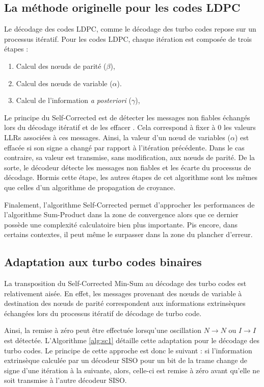 \subsection{La méthode originelle pour les codes LDPC}
Le décodage des codes LDPC, comme le décodage des turbo codes repose sur un processus itératif. Pour les codes LDPC,
chaque itération est composée de trois étapes : 
\begin{enumerate}
	\item Calcul des nœuds de parité ($\beta$),
	\item Calcul des nœuds de variable ($\alpha$).
	\item Calcul de l'information \textit{a posteriori} ($\gamma$),
\end{enumerate}
Le principe du Self-Corrected est de détecter les messages non fiables échangés lors du décodage itératif et de les \og 
effacer \fg. Cela correspond à fixer à 0 les valeurs LLRs associées à ces messages. Ainsi, la valeur d'un nœud de 
variables ($\alpha$) est effacée si son signe a changé par rapport à l’itération précédente. Dans le cas contraire, sa 
valeur est transmise, sans modification, aux nœuds de 
parité. De la sorte, le décodeur détecte les messages non fiables et les écarte du processus de décodage. Hormis cette 
étape, les autres étapes de cet algorithme sont les mêmes que celles d'un algorithme de propagation de croyance.

Finalement, l'algorithme Self-Corrected permet d'approcher les performances de l'algorithme Sum-Product dans la zone de convergence alors
que ce dernier possède une complexité calculatoire bien plus importante. Pis encore, dans certains contextes, il peut même le 
surpasser dans la zone du plancher d'erreur.

\subsection{Adaptation aux turbo codes binaires}
La transposition du Self-Corrected Min-Sum au décodage des turbo codes est relativement aisée. En effet, les messages provenant 
des nœuds de variable à destination des nœuds de parité correspondent aux informations extrinsèques échangées lors 
du processus itératif de décodage de turbo code.

Ainsi, la remise à zéro peut être effectuée lorsqu'une oscillation $N \rightarrow N$ ou $I \rightarrow I$ est détectée.
L'Algorithme \ref{alg:sc1} détaille cette adaptation pour le décodage des turbo codes. Le principe de cette approche est 
donc le suivant : si l’information extrinsèque calculée par un décodeur SISO pour un bit de la trame change de 
signe d’une itération à la suivante, alors, celle-ci est remise à zéro avant qu’elle ne soit transmise à l’autre 
décodeur SISO.

